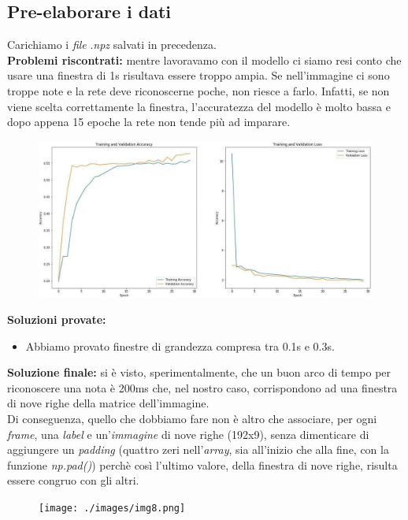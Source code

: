 \subsection{Pre-elaborare i dati}
Carichiamo i \textit{file} .\textit{npz} salvati in precedenza.\\
\newline
\textbf{Problemi riscontrati:} mentre lavoravamo con il modello ci siamo resi conto che usare una finestra di 1s risultava essere troppo ampia. Se nell'immagine ci sono troppe note e la rete deve riconoscerne poche, non riesce a farlo. Infatti, se non viene scelta  correttamente la finestra, l'accuratezza del modello è molto bassa e dopo appena 15 epoche la rete non tende più ad imparare.
\begin{figure}[H]
	\centering
	\includegraphics[scale=0.5]{./images/img28.jpg}
\end{figure}
\textbf{Soluzioni provate:}
\begin{itemize}
	\item Abbiamo provato finestre di grandezza compresa tra 0.1s e 0.3s.
\end{itemize}
\textbf{Soluzione finale:} si è visto, sperimentalmente, che un buon arco di tempo per riconoscere una nota è 200ms che, nel nostro caso, corrispondono ad una finestra di nove righe della matrice dell'immagine.\\
\newline
Di conseguenza, quello che dobbiamo fare non è altro che associare, per ogni \textit{frame}, una \textit{label} e un'\textit{immagine} di nove righe (192x9), senza dimenticare di aggiungere un \textit{padding} (quattro zeri nell'\textit{array}, sia all'inizio che alla fine, con la funzione \textit{np.pad()}) perchè così l'ultimo valore, della finestra di nove righe, risulta essere congruo con gli altri.\\
\newline
\begin{figure}[H]
	\centering
	\texttt{[image: ./images/img8.png]}
\end{figure}
